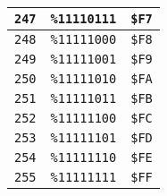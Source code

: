 \begin{multicols}{2}
\begin{center}
\begin{tabular}{|c|c|c|}
 \texttt{247} & \texttt{\%11110111} &  \texttt{\$F7} \\ \hline
 \texttt{248} & \texttt{\%11111000} &  \texttt{\$F8} \\ \hline
 \texttt{249} & \texttt{\%11111001} &  \texttt{\$F9} \\ \hline
 \texttt{250} & \texttt{\%11111010} &  \texttt{\$FA} \\ \hline
 \texttt{251} & \texttt{\%11111011} &  \texttt{\$FB} \\ \hline
 \texttt{252} & \texttt{\%11111100} &  \texttt{\$FC} \\ \hline
 \texttt{253} & \texttt{\%11111101} &  \texttt{\$FD} \\ \hline
 \texttt{254} & \texttt{\%11111110} &  \texttt{\$FE} \\ \hline
 \texttt{255} & \texttt{\%11111111} &  \texttt{\$FF} \\ \hline
	\end{tabular}
\end{center}
\end{multicols}

\vspace*{\fill}

\normalsize

\cleardoublepage